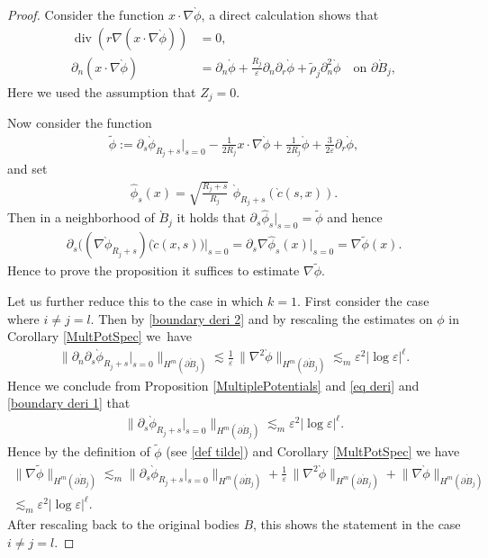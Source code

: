 \documentclass[JEP,XML,SOM,Unicode,published]{cedram}
\let\epsilon\varepsilon
\theoremstyle{definition}
\renewcommand{\div}{\operatorname{div}}
\newcommand\bnorm[1]{\bigl\lVert #1\bigr\rVert}
\newcommand\eq{=}
\let\de\partial
\let\eps\epsilon
\begin{document}
\begin{proof}
Consider the function $x\cdot\nabla\grave{\phi}$, a direct calculation shows that
\begin{equation}\begin{aligned}
\div(r\nabla(x\cdot\nabla\grave{\phi}))&\eq0,\label{n eq}\\
\de_n(x\cdot\nabla\grave{\phi})&\eq\de_n\grave{\phi}+\frac{R_j}{\eps}\de_n\de_r\grave{\phi}+\tilde{\rho}_j\de_n^2\grave{\phi} \quad\text{on $\de\grave{B}_j$},
\end{aligned}\end{equation}
Here we used the assumption that $Z_j=0$.

Now consider the function
\begin{align}\label{def tilde}
\tilde{\phi}:=\de_{s}\grave{\phi}_{R_j+s}\big|_{s=0}-\frac{1}{2R_j}x\cdot\nabla\grave{\phi}+\frac{1}{2R_j}\grave{\phi}+\frac{3}{2\eps}\de_r\grave{\phi},
\end{align}
and set
\begin{align*}
\hat{\phi}_s(x)\eq\sqrt{\frac{R_j+s}{R_j}}\,\,\grave{\phi}_{R_j+s}(\grave{c}(s,x)).
\end{align*}
Then in a neighborhood of $\grave{B}_j$ it holds that $\de_s\hat{\phi}_s|_{s=0}=\tilde{\phi}$ and hence
\begin{align}
\de_s\bigl((\nabla\grave{\phi}_{R_j+s})(\grave{c}(x,s)\bigr)\big|_{s=0}\eq \de_s\nabla\hat{\phi}_s(x)\big|_{s=0} \eq\nabla\tilde{\phi}(x).\label{rewritting phi}
\end{align}
Hence to prove the proposition it suffices to estimate $\nabla\tilde{\phi}$.

Let us further reduce this to the case in which $k=1$. First consider the case where $i\neq j=l$. Then by \eqref{boundary deri 2} and by rescaling the estimates on $\phi$ in Corollary \ref{MultPotSpec} we~have
\begin{align*}
\bnorm{\de_n\de_s\grave{\phi}_{R_j+s}\big|_{s=0}}_{H^m(\de\grave{B}_j)}\lesssim \frac{1}{\eps}\,\bnorm{\nabla^2\grave{\phi}}_{H^{m}(\de\grave{B}_j)}\lesssim_m\eps^{2}|{\log\eps}|^\ell.
\end{align*}
Hence we conclude from Proposition \ref{MultiplePotentials} and \eqref{eq deri} and \eqref{boundary deri 1} that
\begin{align*}
\bnorm{\de_s\grave{\phi}_{R_j+s}\big|_{s=0}}_{H^m(\de\grave{B}_j)}\lesssim_m \eps^{2}|{\log\eps}|^\ell.
\end{align*}
Hence by the definition of $\tilde{\phi}$ (see \eqref{def tilde}) and Corollary \ref{MultPotSpec} we have
\begin{multline*}
\bnorm{\nabla\tilde{\phi}}_{H^m(\de\grave{B}_j)}\lesssim_m \bnorm{\de_s\grave{\phi}_{R_j+s}\big|_{s=0}}_{H^m(\de\grave{B}_j)}+\frac{1}{\eps}\,\bnorm{\nabla^2\grave{\phi}}_{H^m(\de\grave{B}_j)}+\bnorm{\nabla\grave{\phi}}_{H^m(\de\grave{B}_j)}\\
\lesssim_m\eps^{2}|{\log\eps}|^\ell.
\end{multline*}
After rescaling back to the original bodies $B$, this shows the statement in the case $i\neq j=l$.


\end{proof}
\end{document}
